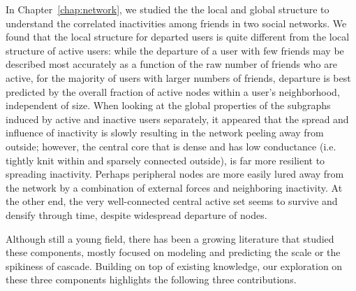 \documentclass[phd,tocprelim]{cornell}
\begin{document}
In Chapter~\ref{chap:network}, we studied the the local and global structure to understand the correlated inactivities among friends in two social networks. We found that the local structure for departed users is quite different from the local structure of active users: while the departure of a user with few friends may be described most accurately as a function of
the raw number of friends who are active, for the majority of users
with larger numbers of friends, departure is best predicted
by the overall fraction of active nodes within a user's neighborhood,
independent of size.  When looking at the global properties of the subgraphs
induced by active and inactive users separately, it appeared that the spread and influence of inactivity is slowly resulting in
the network peeling away from outside; however, the central core that is dense and has low conductance (i.e. tightly knit within and sparsely connected
outside), is far more resilient to spreading inactivity. Perhaps peripheral nodes are more easily lured away from the network by a
combination of external forces and neighboring inactivity. At the other end, the
very well-connected central active set seems to survive and densify through
time, despite widespread departure of nodes.


Although still a young field, there has been a growing literature that studied these components, mostly focused on modeling and predicting the scale or the spikiness of cascade. Building on top of existing knowledge, our exploration on these three components highlights the following three contributions.


\end{document}

